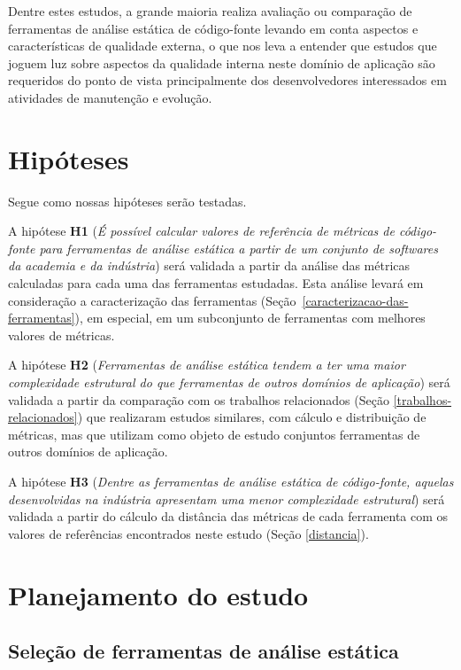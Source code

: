 Dentre estes estudos, a grande maioria realiza avaliação ou comparação de
ferramentas de análise estática de código-fonte levando em conta aspectos e
características de qualidade externa, o que nos leva a entender que estudos
que joguem luz sobre aspectos da qualidade interna neste domínio de aplicação
são requeridos do ponto de vista principalmente dos desenvolvedores
interessados em atividades de manutenção e evolução.

\section{Hipóteses} \label{hipoteses}

Segue como nossas hipóteses serão testadas.

A hipótese {\bf H1} ({\em É possível calcular valores de referência de
métricas de código-fonte para ferramentas de análise estática a partir de um
conjunto de softwares da academia e da indústria}) será validada a partir da
análise das métricas calculadas para cada uma das ferramentas estudadas.  Esta
análise levará em consideração a caracterização das ferramentas
(Seção~\ref{caracterizacao-das-ferramentas}), em especial, em um subconjunto
de ferramentas com melhores valores de métricas.

A hipótese {\bf H2} ({\em Ferramentas de análise estática tendem a ter uma
maior complexidade estrutural do que ferramentas de outros domínios de
aplicação}) será validada a partir da comparação com os trabalhos relacionados
(Seção \ref{trabalhos-relacionados}) que realizaram estudos similares, com
cálculo e distribuição de métricas, mas que utilizam como objeto de estudo
conjuntos ferramentas de outros domínios de aplicação.

A hipótese {\bf H3} ({\em Dentre as ferramentas de análise estática de
código-fonte, aquelas desenvolvidas na indústria apresentam uma menor
complexidade estrutural}) será validada a partir do cálculo da distância das
métricas de cada ferramenta com os valores de referências encontrados neste
estudo (Seção \ref{distancia}).

\section{Planejamento do estudo} \label{planejamento}

\subsection{Seleção de ferramentas de análise estática} \label{levantamento}

